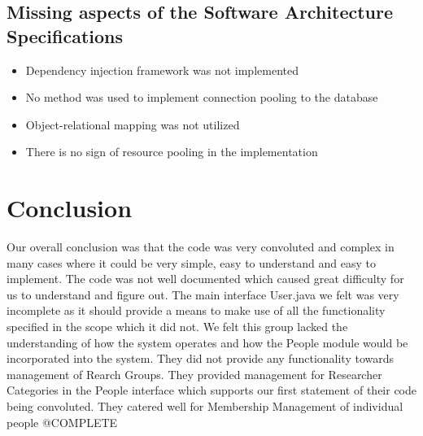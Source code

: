 \documentclass{article}
\begin{document}
	\subsection{Missing aspects of the Software Architecture Specifications}
	\begin{itemize}
		\item Dependency injection framework was not implemented
		\item No method was used to implement connection pooling to the database
		\item Object-relational mapping was not utilized
		\item There is no sign of resource pooling in the implementation
		\item@TODO
	\end{itemize}
	













\section{Conclusion}
Our overall conclusion was that the code was very convoluted and complex in many cases where it could be very simple, easy to understand and easy to implement. The code was not well documented which caused great difficulty for us to understand and figure out. The main interface User.java we felt was very incomplete as it should provide a means to make use of all the functionality specified in the scope which it did not. We felt this group lacked the understanding of how the system operates and how the People module would be incorporated into the system. They did not provide any functionality towards management of Rearch Groups. They provided management for Researcher Categories in the People interface which supports our first statement of their code being convoluted. They catered well for Membership Management of individual people
@COMPLETE
\end{document}
